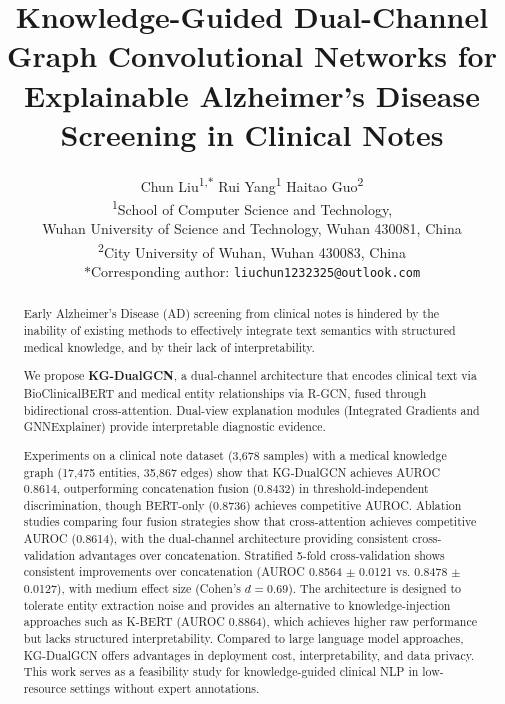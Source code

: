 \documentclass[11pt,onecolumn,a4paper]{article}
\begin{document}
\title{\textbf{Knowledge-Guided Dual-Channel Graph Convolutional Networks for Explainable Alzheimer's Disease Screening in Clinical Notes}}

\author{
  Chun Liu\textsuperscript{1,$\ast$}\quad
  Rui Yang\textsuperscript{1}\quad
  Haitao Guo\textsuperscript{2}\\[8pt]
  \normalsize \textsuperscript{1}School of Computer Science and Technology,\\
  \normalsize Wuhan University of Science and Technology, Wuhan 430081, China\\[4pt]
  \normalsize \textsuperscript{2}City University of Wuhan, Wuhan 430083, China\\[4pt]
  \normalsize $\ast$Corresponding author: \texttt{liuchun1232325@outlook.com}
}
\date{}
\maketitle

\begin{abstract}
Early Alzheimer's Disease (AD) screening from clinical notes is hindered by the inability of existing methods to effectively integrate text semantics with structured medical knowledge, and by their lack of interpretability.

We propose \textbf{KG-DualGCN}, a dual-channel architecture that encodes clinical text via BioClinicalBERT and medical entity relationships via R-GCN, fused through bidirectional cross-attention. Dual-view explanation modules (Integrated Gradients and GNNExplainer) provide interpretable diagnostic evidence.

Experiments on a clinical note dataset (3,678 samples) with a medical knowledge graph (17,475 entities, 35,867 edges) show that KG-DualGCN achieves AUROC 0.8614, outperforming concatenation fusion (0.8432) in threshold-independent discrimination, though BERT-only (0.8736) achieves competitive AUROC. Ablation studies comparing four fusion strategies show that cross-attention achieves competitive AUROC (0.8614), with the dual-channel architecture providing consistent cross-validation advantages over concatenation. Stratified 5-fold cross-validation shows consistent improvements over concatenation (AUROC 0.8564 $\pm$ 0.0121 vs. 0.8478 $\pm$ 0.0127), with medium effect size (Cohen's $d = 0.69$). The architecture is designed to tolerate entity extraction noise and provides an alternative to knowledge-injection approaches such as K-BERT (AUROC 0.8864), which achieves higher raw performance but lacks structured interpretability. Compared to large language model approaches, KG-DualGCN offers advantages in deployment cost, interpretability, and data privacy. This work serves as a feasibility study for knowledge-guided clinical NLP in low-resource settings without expert annotations.
\end{abstract}
\end{document}
